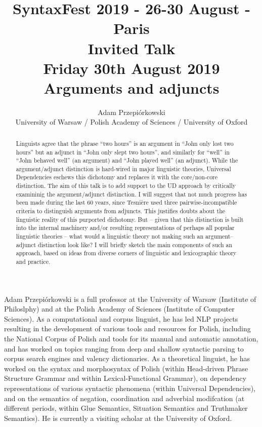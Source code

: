 \documentclass[11pt]{article}
\title{{\footnotesize SyntaxFest 2019 - 26-30 August - Paris}\\
\vspace{10mm}
 Invited Talk\\
  {\small Friday 30th August 2019}\\
  Arguments and adjuncts}
\author{Adam Przepiórkowski\\
  University of Warsaw / Polish Academy of Sciences / University of Oxford}
\begin{document}
\maketitle
\begin{abstract}
Linguists agree that the phrase “two hours” is an argument in “John only lost two hours” but an adjunct in “John only slept two hours”, and similarly for “well” in “John behaved well” (an argument) and “John played well” (an adjunct). While the argument/adjunct distinction is hard-wired in major linguistic theories, Universal Dependencies eschews this dichotomy and replaces it with the core/non-core distinction. The aim of this talk is to add support to the UD approach by critically examininig the argument/adjunct distinction. I will suggest that not much progress has been made during the last 60 years, since Tesnière used three pairwise-incompatible criteria to distinguish arguments from adjuncts. This justifies doubts about the linguistic reality of this purported dichotomy. But – given that this distinction is built into the internal machinery and/or resulting representations of perhaps all popular linguistic theories – what would a linguistic theory not making such an argument–adjunct distinction look like? I will briefly sketch the main components of such an approach, based on ideas from diverse corners of linguistic and lexicographic theory and practice.
\end{abstract}

\vspace{4mm}
\begin{shortbio}
  Adam Przepiórkowski is a full professor at the University of Warsaw (Institute of Philoslphy) and at the Polish Academy of Sciences (Institute of Computer Sciences). As a computational and corpus linguist, he has led NLP projects resulting in the development of various tools and resources for Polish, including the National Corpus of Polish and tools for its manual and automatic annotation, and has worked on topics ranging from deep and shallow syntactic parsing to corpus search engines and valency dictionaries. As a theoretical linguist, he has worked on the syntax and morphosyntax of Polish (within Head-driven Phrase Structure Grammar and within Lexical-Functional Grammar), on dependency representations of various syntactic phenomena (within Universal Dependencies), and on the semantics of negation, coordination and adverbial modifcation (at different periods, within Glue Semantics, Situation Semantics and Truthmaker Semantics). He is currently a visiting scholar at the University of Oxford.
  
\end{shortbio}
\end{document}
